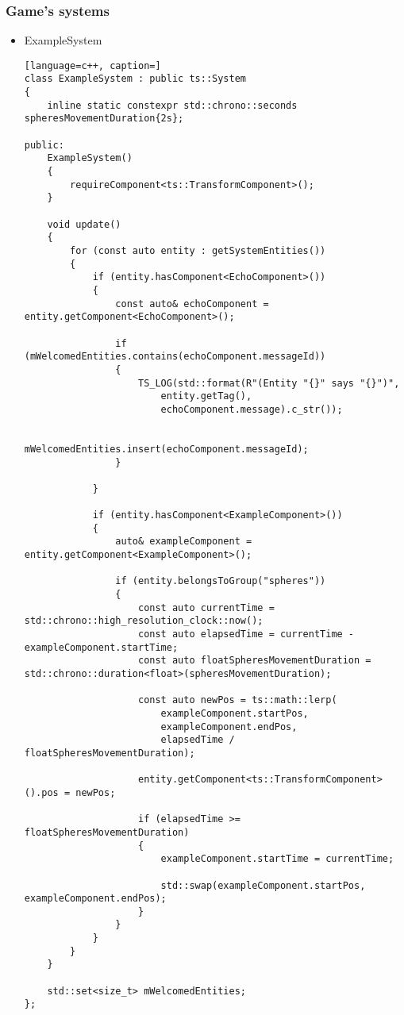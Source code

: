 \subsubsection{Game's systems}
\begin{itemize}
    \item ExampleSystem
\begin{lstlisting}[language=c++, caption=]
class ExampleSystem : public ts::System
{
    inline static constexpr std::chrono::seconds spheresMovementDuration{2s};

public:
    ExampleSystem()
    {
        requireComponent<ts::TransformComponent>();
    }

    void update()
    {
        for (const auto entity : getSystemEntities())
        {
            if (entity.hasComponent<EchoComponent>())
            {
                const auto& echoComponent = entity.getComponent<EchoComponent>();

                if (mWelcomedEntities.contains(echoComponent.messageId))
                {
                    TS_LOG(std::format(R"(Entity "{}" says "{}")",
                        entity.getTag(),
                        echoComponent.message).c_str());

                    mWelcomedEntities.insert(echoComponent.messageId);
                }

            }

            if (entity.hasComponent<ExampleComponent>())
            {
                auto& exampleComponent = entity.getComponent<ExampleComponent>();

                if (entity.belongsToGroup("spheres"))
                {
                    const auto currentTime = std::chrono::high_resolution_clock::now();
                    const auto elapsedTime = currentTime - exampleComponent.startTime;
                    const auto floatSpheresMovementDuration = std::chrono::duration<float>(spheresMovementDuration);

                    const auto newPos = ts::math::lerp(
                        exampleComponent.startPos,
                        exampleComponent.endPos,
                        elapsedTime / floatSpheresMovementDuration);

                    entity.getComponent<ts::TransformComponent>().pos = newPos;

                    if (elapsedTime >= floatSpheresMovementDuration)
                    {
                        exampleComponent.startTime = currentTime;

                        std::swap(exampleComponent.startPos, exampleComponent.endPos);
                    }
                }
            }
        }
    }

    std::set<size_t> mWelcomedEntities;
};
\end{lstlisting}
\end{itemize}

